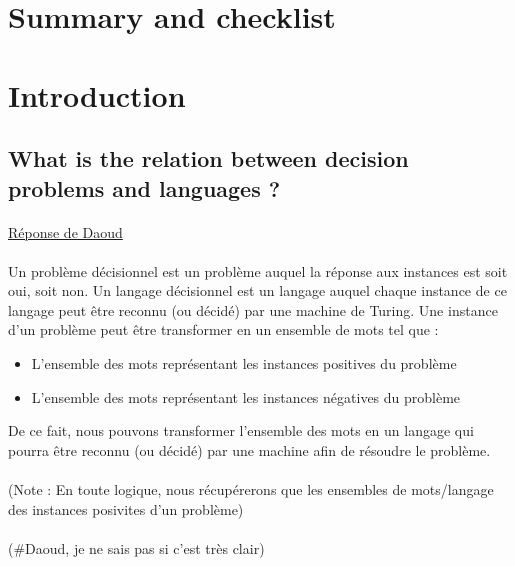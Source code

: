 \tableofcontents
\newpage
\section{Summary and checklist}
\paragraph{}


\section{Introduction}
\subsection{What is the relation between decision problems and languages ?}
\paragraph{}
\underline{Réponse de Daoud}
\paragraph{}
Un problème décisionnel est un problème auquel la réponse aux instances est soit oui, soit non. Un langage décisionnel est un langage auquel chaque instance de ce langage peut être reconnu (ou décidé) par une machine de Turing. Une instance d'un problème peut être transformer en un ensemble de mots tel que :
\begin{itemize}
\item L'ensemble des mots représentant les instances positives du problème
\item L'ensemble des mots représentant les instances négatives du problème
\end{itemize} 
De ce fait, nous pouvons transformer l'ensemble des mots en un langage qui pourra être reconnu (ou décidé) par une machine afin de résoudre le problème.

\paragraph{}
(Note : En toute logique, nous récupérerons que les ensembles de mots/langage des instances posivites d'un problème)

\paragraph{}
(\#Daoud, je ne sais pas si c'est très clair)
